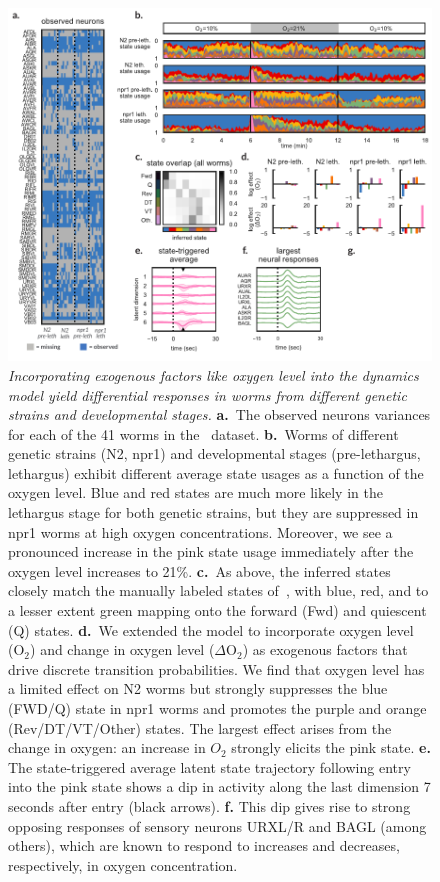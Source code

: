 \documentclass[11pt]{article}
\begin{document}
\begin{figure}[t!]
\centering
\includegraphics[width=6in]{figures/v3/figure7} 
\caption{\textit{Incorporating exogenous factors like oxygen level
    into the dynamics model yield differential responses in worms from
    different genetic strains and developmental stages.}
  \textbf{a.}~The observed neurons variances for each of the 41 worms
  in the~\citet{nichols2017global} dataset.  \textbf{b.}~Worms of
  different genetic strains (N2, npr1) and developmental stages
  (pre-lethargus, lethargus) exhibit different average state usages as
  a function of the oxygen level.  Blue and red states are much more
  likely in the lethargus stage for both genetic strains, but they are
  suppressed in npr1 worms at high oxygen concentrations. Moreover, we
  see a pronounced increase in the pink state usage immediately after
  the oxygen level increases to 21\%.  \textbf{c.}~As above, the
  inferred states closely match the manually labeled states
  of~\citet{nichols2017global}, with blue, red, and to a lesser extent
  green mapping onto the forward (\textsf{Fwd}) and quiescent
  (\textsf{Q}) states.  \textbf{d.}~We extended the model to
  incorporate oxygen level (O$_2$) and change in oxygen level
  ($\Delta$O$_2$) as exogenous factors that drive discrete transition
  probabilities.  We find that oxygen level has a limited effect on N2
  worms but strongly suppresses the blue (\textsf{FWD/Q}) state in
  npr1 worms and promotes the purple and orange
  (\textsf{Rev/DT/VT/Other}) states. The largest effect arises from
  the change in oxygen: an increase in $O_2$ strongly elicits the pink
  state.  \textbf{e.} The state-triggered average latent state
  trajectory following entry into the pink state shows a dip in
  activity along the last dimension 7 seconds after entry (black
  arrows).  \textbf{f.} This dip gives rise to strong opposing
  responses of sensory neurons \textsf{URXL/R} and \textsf{BAGL}
  (among others), which are known to respond to increases and
  decreases, respectively, in oxygen concentration.  }
\label{fig:o2}
\end{figure}
\end{document}
